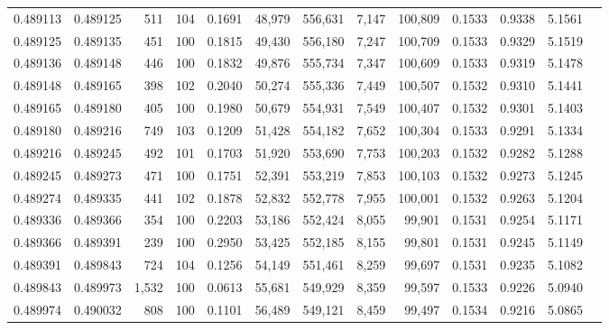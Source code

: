 \begin{tabular}{rrrrrrrrrrrrr}
0.489113 & 0.489125 &   511 & 104 &                                     0.1691 &  48,979 & 556,631 &   7,147 & 100,809 & 0.1533 & 0.9338 & 5.1561 \\
0.489125 & 0.489135 &   451 & 100 &                                     0.1815 &  49,430 & 556,180 &   7,247 & 100,709 & 0.1533 & 0.9329 & 5.1519 \\
0.489136 & 0.489148 &   446 & 100 &                                     0.1832 &  49,876 & 555,734 &   7,347 & 100,609 & 0.1533 & 0.9319 & 5.1478 \\
0.489148 & 0.489165 &   398 & 102 &                                     0.2040 &  50,274 & 555,336 &   7,449 & 100,507 & 0.1532 & 0.9310 & 5.1441 \\
0.489165 & 0.489180 &   405 & 100 &                                     0.1980 &  50,679 & 554,931 &   7,549 & 100,407 & 0.1532 & 0.9301 & 5.1403 \\
0.489180 & 0.489216 &   749 & 103 &                                     0.1209 &  51,428 & 554,182 &   7,652 & 100,304 & 0.1533 & 0.9291 & 5.1334 \\
0.489216 & 0.489245 &   492 & 101 &                                     0.1703 &  51,920 & 553,690 &   7,753 & 100,203 & 0.1532 & 0.9282 & 5.1288 \\
0.489245 & 0.489273 &   471 & 100 &                                     0.1751 &  52,391 & 553,219 &   7,853 & 100,103 & 0.1532 & 0.9273 & 5.1245 \\
0.489274 & 0.489335 &   441 & 102 &                                     0.1878 &  52,832 & 552,778 &   7,955 & 100,001 & 0.1532 & 0.9263 & 5.1204 \\
0.489336 & 0.489366 &   354 & 100 &                                     0.2203 &  53,186 & 552,424 &   8,055 &  99,901 & 0.1531 & 0.9254 & 5.1171 \\
0.489366 & 0.489391 &   239 & 100 &                                     0.2950 &  53,425 & 552,185 &   8,155 &  99,801 & 0.1531 & 0.9245 & 5.1149 \\
0.489391 & 0.489843 &   724 & 104 &                                     0.1256 &  54,149 & 551,461 &   8,259 &  99,697 & 0.1531 & 0.9235 & 5.1082 \\
0.489843 & 0.489973 & 1,532 & 100 &                                     0.0613 &  55,681 & 549,929 &   8,359 &  99,597 & 0.1533 & 0.9226 & 5.0940 \\
0.489974 & 0.490032 &   808 & 100 &                                     0.1101 &  56,489 & 549,121 &   8,459 &  99,497 & 0.1534 & 0.9216 & 5.0865 \\

\end{tabular}
